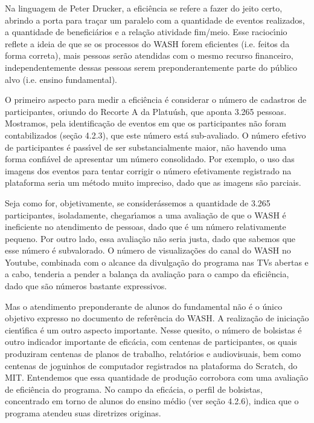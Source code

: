 \documentclass[
12pt,		%
openright,	%
twoside,  %
a4paper,			%
chapter=TITLE,		%
english,			%
french,				%
spanish,			%
brazil				%
]{USPSC-classe/USPSC}
\begin{document}
Na linguagem de Peter Drucker, a efici\^encia se refere a \textquotedbl fazer do jeito certo\textquotedbl , abrindo a porta para tra\c{c}ar um paralelo com a quantidade de eventos realizados, a quantidade de benefici\'arios e a rela\c{c}\~ao atividade fim/meio. Esse racioc\'{\i}nio reflete a ideia de que se os processos do WASH forem eficientes (i.e. \textquotedbl feitos da forma correta\textquotedbl ), mais pessoas ser\~ao atendidas com o mesmo recurso financeiro, independentemente dessas pessoas serem preponderantemente parte do p\'ublico alvo (i.e. ensino fundamental).








O primeiro aspecto para medir a efici\^encia \'e considerar o n\'umero de cadastros de participantes, oriundo do Recorte A da Platu\'ush, que aponta 3.265 pessoas. Mostramos, pela identifica\c{c}\~ao de eventos em que os participantes n\~ao foram contabilizados (se\c{c}\~ao 4.2.3), que este n\'umero est\'a sub-avaliado. O n\'umero efetivo  de participantes \'e pass\'{\i}vel de ser substancialmente maior, n\~ao havendo uma forma confi\'avel de apresentar um n\'umero consolidado. Por exemplo, o uso das imagens dos eventos para tentar corrigir o n\'umero efetivamente registrado na plataforma seria um m\'etodo muito impreciso, dado que as imagens s\~ao parciais.








Seja como for, objetivamente, se consider\'assemos a quantidade de 3.265 participantes, isoladamente, chegar\'{\i}amos a uma avalia\c{c}\~ao de que o WASH \'e ineficiente no atendimento de pessoas, dado que \'e um n\'umero relativamente pequeno. Por outro lado, essa avalia\c{c}\~ao n\~ao seria justa, dado que sabemos que esse n\'umero \'e subvalorado. O n\'umero de visualiza\c{c}\~oes do canal do WASH no Youtube, combinada com o alcance da divulga\c{c}\~ao do programa nas TVs abertas e a cabo, tenderia a pender a balan\c{c}a da avalia\c{c}\~ao para o campo da efici\^encia, dado que s\~ao n\'umeros bastante expressivos.








Mas o atendimento preponderante de alunos do fundamental n\~ao \'e o \'unico objetivo expresso no documento de refer\^encia do WASH. A realiza\c{c}\~ao de inicia\c{c}\~ao cient\'{\i}fica \'e um outro aspecto importante. Nesse quesito, o n\'umero de bolsistas \'e outro indicador importante de efic\'acia, com centenas de participantes, os quais produziram centenas de planos de trabalho, relat\'orios e audiovisuais, bem como centenas de joguinhos de computador registrados na plataforma do Scratch, do MIT. Entendemos que essa quantidade de produ\c{c}\~ao corrobora com uma avalia\c{c}\~ao de efici\^encia do programa. No campo da efic\'acia, o perfil de bolsistas, concentrado em torno de alunos do ensino m\'edio (ver se\c{c}\~ao 4.2.6), indica que o programa atendeu suas diretrizes originas.
\end{document}
